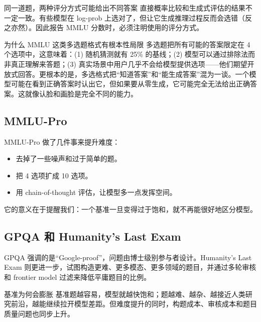 \begin{warningbox}{同一道题，两种评分方式可能给出不同答案}
直接概率比较和生成式评估的结果不一定一致。有些模型在 log-prob 上选对了，但让它生成推理过程反而会选错（反之亦然）。因此报告 MMLU 分数时，必须注明使用的评分方式。
\end{warningbox}

\begin{knowledgebox}{为什么 MMLU 这类多选题格式有根本性局限}
多选题把所有可能的答案限定在 4 个选项中，这意味着：(1) 随机猜测就有 25\% 的基线；(2) 模型可以通过排除法而非真正理解来答题；(3) 真实场景中用户几乎不会给模型提供选项——他们期望开放式回答。更根本的是，多选格式把``知道答案''和``能生成答案''混为一谈。一个模型可能在看到正确答案时认出它，但如果要从零生成，它可能完全无法给出正确答案。这就像认脸和画脸是完全不同的能力。
\end{knowledgebox}

\subsection{MMLU-Pro}

MMLU-Pro 做了几件事来提升难度：

\begin{itemize}
    \item 去掉了一些噪声和过于简单的题。
    \item 把 4 选项扩成 10 选项。
    \item 用 chain-of-thought 评估，让模型多一点发挥空间。
\end{itemize}

它的意义在于提醒我们：一个基准一旦变得过于饱和，就不再能很好地区分模型。

\subsection{GPQA 和 Humanity's Last Exam}

GPQA 强调的是``Google-proof''，问题由博士级别参与者设计。Humanity's Last Exam 则更进一步，试图构造更难、更多模态、更多领域的题目，并通过多轮审核和 frontier model 过滤来降低平庸题目的比例。

\begin{importantbox}{基准为何会膨胀}
基准题越容易，模型就越快饱和；题越难、越杂、越接近人类研究前沿，越能继续拉开模型差距。但难度提升的同时，构题成本、审核成本和题目质量问题也同步上升。
\end{importantbox}

